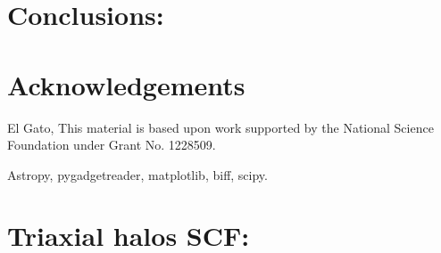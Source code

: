 \documentclass[a4paper,fleqn,usenatbib]{mnras}
\begin{document}
\section{Conclusions:}



\section*{Acknowledgements}
El Gato, 
This material is based upon work supported by the National Science
Foundation under Grant No. 1228509.

Astropy, pygadgetreader, matplotlib, biff, scipy.










\appendix

\section{Triaxial halos SCF:}




\bsp	%
\label{lastpage}
\end{document}

